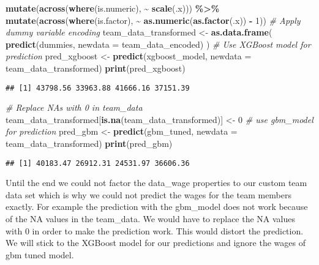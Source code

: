 \documentclass[
]{article}
\newenvironment{Shaded}{\begin{snugshade}}{\end{snugshade}}
\newcommand{\AttributeTok}[1]{\textcolor[rgb]{0.13,0.29,0.53}{#1}}
\newcommand{\CommentTok}[1]{\textcolor[rgb]{0.56,0.35,0.01}{\textit{#1}}}
\newcommand{\DecValTok}[1]{\textcolor[rgb]{0.00,0.00,0.81}{#1}}
\newcommand{\FunctionTok}[1]{\textcolor[rgb]{0.13,0.29,0.53}{\textbf{#1}}}
\newcommand{\NormalTok}[1]{#1}
\newcommand{\OtherTok}[1]{\textcolor[rgb]{0.56,0.35,0.01}{#1}}
\newcommand{\SpecialCharTok}[1]{\textcolor[rgb]{0.81,0.36,0.00}{\textbf{#1}}}
\begin{document}
\begin{Shaded}
\begin{Highlighting}[]
  \FunctionTok{mutate}\NormalTok{(}\FunctionTok{across}\NormalTok{(}\FunctionTok{where}\NormalTok{(is.numeric), }\SpecialCharTok{\textasciitilde{}} \FunctionTok{scale}\NormalTok{(.x))) }\SpecialCharTok{\%\textgreater{}\%}
  \FunctionTok{mutate}\NormalTok{(}\FunctionTok{across}\NormalTok{(}\FunctionTok{where}\NormalTok{(is.factor), }\SpecialCharTok{\textasciitilde{}} \FunctionTok{as.numeric}\NormalTok{(}\FunctionTok{as.factor}\NormalTok{(.x)) }\SpecialCharTok{{-}} \DecValTok{1}\NormalTok{))}
\CommentTok{\# Apply dummy variable encoding}
\NormalTok{team\_data\_transformed }\OtherTok{\textless{}{-}} \FunctionTok{as.data.frame}\NormalTok{(}
  \FunctionTok{predict}\NormalTok{(dummies, }\AttributeTok{newdata =}\NormalTok{ team\_data\_encoded)}
\NormalTok{)}
\CommentTok{\# Use XGBoost model for prediction}
\NormalTok{pred\_xgboost }\OtherTok{\textless{}{-}} \FunctionTok{predict}\NormalTok{(xgboost\_model, }\AttributeTok{newdata =}\NormalTok{ team\_data\_transformed)}
\FunctionTok{print}\NormalTok{(pred\_xgboost)}
\end{Highlighting}
\end{Shaded}

\begin{verbatim}
## [1] 43798.56 33963.88 41666.16 37151.39
\end{verbatim}

\begin{Shaded}
\begin{Highlighting}[]
\CommentTok{\# Replace NAs with 0 in team\_data}
\NormalTok{team\_data\_transformed[}\FunctionTok{is.na}\NormalTok{(team\_data\_transformed)] }\OtherTok{\textless{}{-}} \DecValTok{0}
\CommentTok{\# use gbm\_model for prediction}
\NormalTok{pred\_gbm }\OtherTok{\textless{}{-}} \FunctionTok{predict}\NormalTok{(gbm\_tuned, }\AttributeTok{newdata =}\NormalTok{ team\_data\_transformed)}
\FunctionTok{print}\NormalTok{(pred\_gbm)}
\end{Highlighting}
\end{Shaded}

\begin{verbatim}
## [1] 40183.47 26912.31 24531.97 36606.36
\end{verbatim}

Until the end we could not factor the data\_wage properties to our
custom team data set which is why we could not predict the wages for the
team members exactly. For example the prediction with the gbm\_model
does not work because of the NA values in the team\_data. We would have
to replace the NA values with 0 in order to make the prediction work.
This would distort the prediction. We will stick to the XGBoost model
for our predictions and ignore the wages of gbm tuned model.
\end{document}
